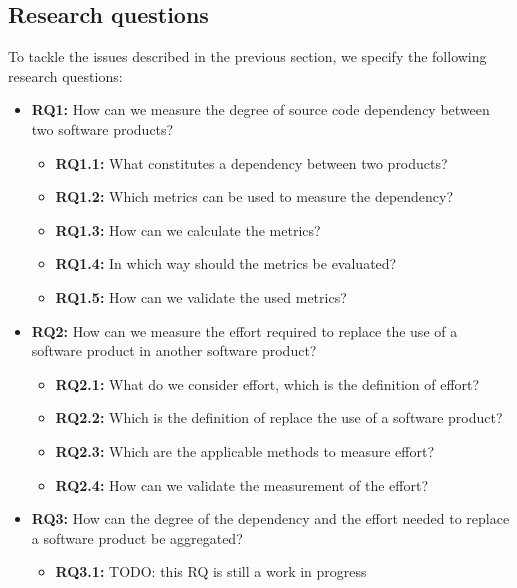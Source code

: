 \subsection{Research questions} %
To tackle the issues described in the previous section, we specify the following research questions:

\begin{itemize}
    \item \textbf{RQ1:} How can we measure the degree of source code dependency between two software products?

    \begin{itemize}
      \item \textbf{RQ1.1:} What constitutes a dependency between two products?
      \item \textbf{RQ1.2:} Which metrics can be used to measure the dependency?
      \item \textbf{RQ1.3:} How can we calculate the metrics?
      \item \textbf{RQ1.4:} In which way should the metrics be evaluated?
      \item \textbf{RQ1.5:} How can we validate the used metrics?
    \end{itemize}

    \item \textbf{RQ2:} How can we measure the effort required to replace the use of a software product in another software product?

    \begin{itemize}
      \item \textbf{RQ2.1:} What do we consider effort, which is the definition of effort?
      \item \textbf{RQ2.2:} Which is the definition of replace the use of a software product?
      \item \textbf{RQ2.3:} Which are the applicable methods to measure effort?
      \item \textbf{RQ2.4:} How can we validate the measurement of the effort?
    \end{itemize}

    \item \textbf{RQ3:} How can the degree of the dependency and the effort needed to replace a software product be aggregated?
    \begin{itemize}
      \item \textbf{RQ3.1:} TODO: this RQ is still a work in progress
    \end{itemize}
\end{itemize}

